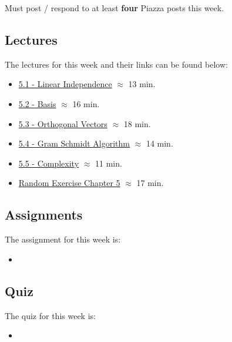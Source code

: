 Must post / respond to at least \textbf{four} Piazza posts this week.

\subsection{Lectures}

The lectures for this week and their links can be found below:

\begin{itemize}
    \item \href{https://applied.cs.colorado.edu/mod/hvp/view.php?id=50717}{5.1 - Linear Independence} $\approx$ 13 min.
    \item \href{https://applied.cs.colorado.edu/mod/hvp/view.php?id=50718}{5.2 - Basis} $\approx$ 16 min.
    \item \href{https://applied.cs.colorado.edu/mod/hvp/view.php?id=50719}{5.3 - Orthogonal Vectors} $\approx$ 18 min.
    \item \href{https://applied.cs.colorado.edu/mod/hvp/view.php?id=50720}{5.4 - Gram Schmidt Algorithm} $\approx$ 14 min.
    \item \href{https://applied.cs.colorado.edu/mod/hvp/view.php?id=50721}{5.5 - Complexity} $\approx$ 11 min.
    \item \href{https://applied.cs.colorado.edu/mod/hvp/view.php?id=50722}{Random Exercise Chapter 5} $\approx$ 17 min.
\end{itemize}

\subsection{Assignments}

The assignment for this week is:

\begin{itemize}
    \item {}
\end{itemize}

\subsection{Quiz}

The quiz for this week is:

\begin{itemize}
    \item {}
\end{itemize}

